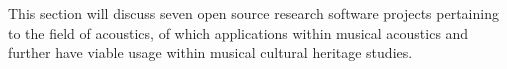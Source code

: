 This section will discuss seven open source research software projects pertaining to the field of acoustics, of which applications within musical acoustics and further have viable usage within musical cultural heritage studies.










